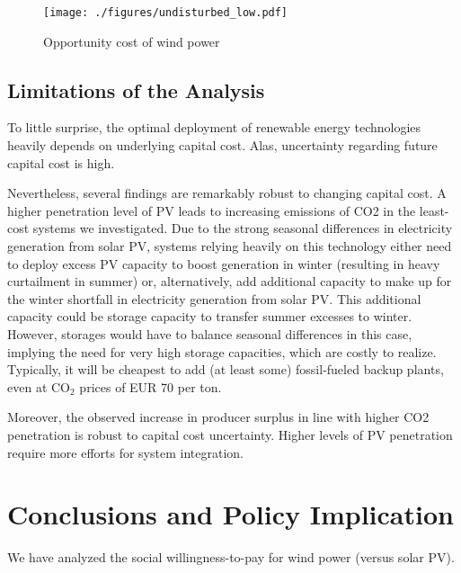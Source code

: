 \documentclass[review, 3p, times]{elsarticle} %
\newcommand{\COO}{\ensuremath{\mathrm{CO_2}} }
\begin{document}
\begin{figure*}
\centering
\texttt{[image: ./figures/undisturbed\_low.pdf]}
\caption{Opportunity cost of wind power}
\end{figure*}


\subsection{Limitations of the Analysis}
To little surprise, the optimal deployment of renewable energy technologies heavily depends on underlying capital
cost.
Alas, uncertainty regarding future capital cost is high.

Nevertheless, several findings are remarkably robust to changing capital cost.
A higher penetration level of PV leads to increasing emissions of CO2 in the least-cost systems we investigated.
Due to the strong seasonal differences in electricity generation from solar PV, systems relying heavily on this technology either need to deploy excess PV capacity to boost generation in winter (resulting in heavy curtailment in summer) or, alternatively, add additional capacity to make up for the winter shortfall in electricity generation from solar PV.
This additional capacity could be storage capacity to transfer summer excesses to winter.
However, storages would have to balance seasonal differences in this case, implying the need for very high storage capacities, which are costly to realize.
Typically, it will be cheapest to add (at least some) fossil-fueled backup plants, even at \COO prices of EUR 70 per ton.

Moreover, the observed increase in producer surplus in line with higher CO2 penetration is robust to capital cost uncertainty.
Higher levels of PV penetration require more efforts for system integration.


\section{Conclusions and Policy Implication} \label{sec:conclusions-policy-implication}
We have analyzed the social willingness-to-pay for wind power (versus solar PV).
\end{document}
